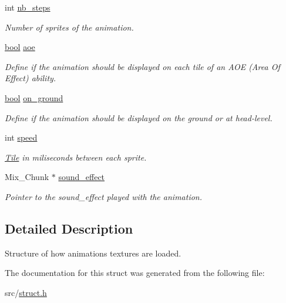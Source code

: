 \begin{DoxyCompactItemize}
\mbox{\label{struct_anim_texture_a59c1b261e88950d13979194bd7a45915}} 
int \hyperlink{struct_anim_texture_a59c1b261e88950d13979194bd7a45915}{nb\+\_\+steps}
\begin{DoxyCompactList}\small\item\em Number of sprites of the animation. \end{DoxyCompactList}\item 
\mbox{\label{struct_anim_texture_a4522bceaeace9c6cf2b60f1745249ffe}} 
\hyperlink{common_8h_af6a258d8f3ee5206d682d799316314b1}{bool} \hyperlink{struct_anim_texture_a4522bceaeace9c6cf2b60f1745249ffe}{aoe}
\begin{DoxyCompactList}\small\item\em Define if the animation should be displayed on each tile of an A\+OE (Area Of Effect) ability. \end{DoxyCompactList}\item 
\mbox{\label{struct_anim_texture_a01bc376437dc0b8194e9fc7abba08a6b}} 
\hyperlink{common_8h_af6a258d8f3ee5206d682d799316314b1}{bool} \hyperlink{struct_anim_texture_a01bc376437dc0b8194e9fc7abba08a6b}{on\+\_\+ground}
\begin{DoxyCompactList}\small\item\em Define if the animation should be displayed on the ground or at head-\/level. \end{DoxyCompactList}\item 
\mbox{\label{struct_anim_texture_abfe7a1c3042d0d420b49b21f57b7e225}} 
int \hyperlink{struct_anim_texture_abfe7a1c3042d0d420b49b21f57b7e225}{speed}
\begin{DoxyCompactList}\small\item\em \hyperlink{struct_tile}{Tile} in miliseconds between each sprite. \end{DoxyCompactList}\item 
\mbox{\label{struct_anim_texture_a6e905369d58781861467a13b171a7db0}} 
Mix\+\_\+\+Chunk $\ast$ \hyperlink{struct_anim_texture_a6e905369d58781861467a13b171a7db0}{sound\+\_\+effect}
\begin{DoxyCompactList}\small\item\em Pointer to the sound\+\_\+effect played with the animation. \end{DoxyCompactList}\end{DoxyCompactItemize}


\subsection{Detailed Description}
Structure of how animations textures are loaded. 

The documentation for this struct was generated from the following file\+:\begin{DoxyCompactItemize}
\item 
src/\hyperlink{struct_8h}{struct.\+h}\end{DoxyCompactItemize}
